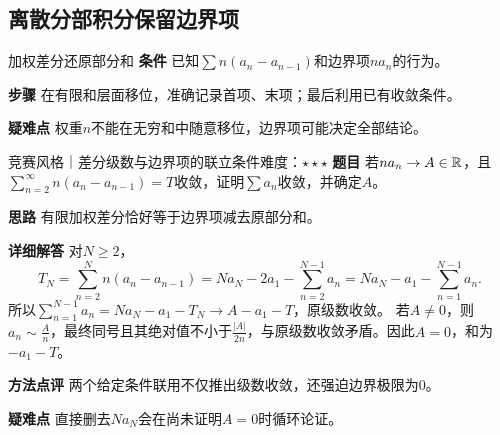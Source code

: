 \subsection{离散分部积分保留边界项}\label{cse:weighted}
\begin{method}{加权差分还原部分和}
\textbf{条件} 已知$\sum n(a_n-a_{n-1})$和边界项$na_n$的行为。
\par\textbf{步骤} 在有限和层面移位，准确记录首项、末项；最后利用已有收敛条件。
\par\textbf{疑难点} 权重$n$不能在无穷和中随意移位，边界项可能决定全部结论。
\end{method}
\begin{example}{竞赛风格｜差分级数与边界项的联立条件}{难度：$\star\star\star$}\label{cse:ex:boundary}
\textbf{题目} 若$na_n\to A\in\mathbb{R}$，且$\sum_{n=2}^{\infty}n(a_n-a_{n-1})=T$收敛，证明$\sum a_n$收敛，并确定$A$。
\par\textbf{思路} 有限加权差分恰好等于边界项减去原部分和。
\par\textbf{详细解答} 对$N\ge2$，
\[
T_N=\sum_{n=2}^{N}n(a_n-a_{n-1})
=Na_N-2a_1-\sum_{n=2}^{N-1}a_n
=Na_N-a_1-\sum_{n=1}^{N-1}a_n.
\]
所以$\sum_{n=1}^{N-1}a_n=Na_N-a_1-T_N\to A-a_1-T$，原级数收敛。
若$A\ne0$，则$a_n\sim \frac{A}{n}$，最终同号且其绝对值不小于$\frac{|A|}{2n}$，与原级数收敛矛盾。因此$A=0$，和为$-a_1-T$。
\par\textbf{方法点评} 两个给定条件联用不仅推出级数收敛，还强迫边界极限为0。
\par\textbf{疑难点} 直接删去$Na_N$会在尚未证明$A=0$时循环论证。
\end{example}
